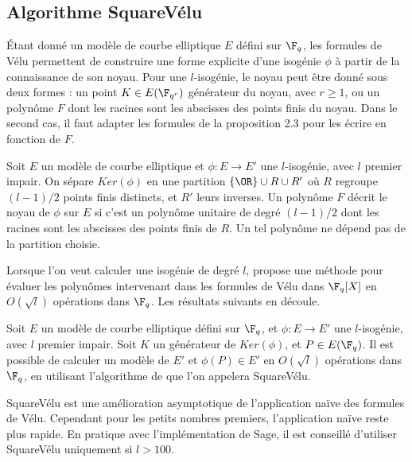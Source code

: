 \subsection{Algorithme SquareVélu}

Étant donné un modèle de courbe elliptique $E$ défini sur $\F_{q}$, les formules de Vélu permettent de construire une forme explicite d'une isogénie $\phi$ à partir de la connaissance de son noyau. Pour une $l$-isogénie, le noyau peut être donné sous deux formes : un point $K\in E(\F_{q^{r}})$ générateur du noyau, avec $r \geq 1$, ou un polynôme $F$ dont les racines sont les abscisses des points finis du noyau. Dans le second cas, il faut adapter les formules de la proposition 2.3 pour les écrire en fonction de $F$.

\begin{Def}
	Soit $E$ un modèle de courbe elliptique et $\phi : E\rightarrow E'$ une $l$-isogénie, avec $l$ premier impair. On sépare $Ker(\phi)$ en une partition $\left\lbrace \OR \right\rbrace \cup R\cup R'$ où $R$ regroupe $(l-1)/2$ points finis distincts, et $R'$ leurs inverses. Un polynôme $F$ décrit le noyau de $\phi$ sur $E$ si c'est un polynôme unitaire de degré $(l-1)/2$ dont les racines sont les abscisses des points finis de $R$. Un tel polynôme ne dépend pas de la partition choisie. 
\end{Def}

Lorsque l'on veut calculer une isogénie de degré $l$, \cite{Velusqrt} propose une méthode pour évaluer les polynômes intervenant dans les formules de Vélu dans $\F_{q}[X]$ en $O(\sqrt{l})$ opérations dans $\F_{q}$. Les résultats suivants en découle.

\begin{Prop}
	Soit $E$ un modèle de courbe elliptique défini sur $\F_{q}$, et $\phi : E\rightarrow E'$ une $l$-isogénie, avec $l$ premier impair. Soit $K$ un générateur de $Ker(\phi)$, et $P\in E(\F_{q})$. Il est possible de calculer un modèle de $E'$ et $\phi(P)\in E'$ en $O(\sqrt{l})$ opérations dans $\F_{q}$, en utilisant l'algorithme de \cite{Velusqrt} que l'on appelera SquareVélu.
\end{Prop}

\begin{Rem}
	SquareVélu est une amélioration asymptotique de l'application naïve des formules de Vélu. Cependant pour les petits nombres premiers, l'application naïve reste plus rapide. En pratique avec l’implémentation de Sage, il est conseillé d'utiliser SquareVélu uniquement si $l > 100$. 
\end{Rem}

